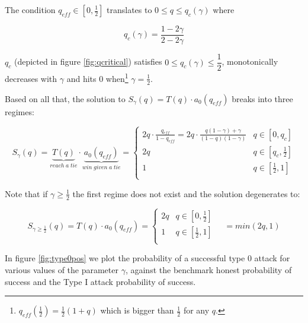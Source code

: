 \documentclass[letterpaper,12pt]{report}
\theoremstyle{plain}
\theoremstyle{definition}
\begin{document}
The condition $q_{eff}\in [0,\frac{1}{2}]$ translates to $0\leq q\leq q_{c}(\gamma)$ where

\begin{equation}\label{qcrit}
q_{c}(\gamma)=\dfrac{1-2\gamma}{2-2\gamma}
\end{equation}

$q_c$ (depicted in figure \ref{fig:qcritical}) satisfies $0 \leq   q_{c}(\gamma) \leq\dfrac{1}{2}$, monotonically decreases with $\gamma$ and hits $0$ when\footnote{$q_{eff}(\frac{1}{2})=\frac{1}{2}(1+q)$ which is bigger than $\frac{1}{2}$ for any $q$.} $\gamma=\frac{1}{2}$.



Based on all that, the solution to $S_\gamma(q)=T(q)\cdot a_0(q_{eff})$ breaks into three regimes:

\begin{equation}\label{sofq}
S_\gamma(q)=\underbrace{T(q)}_{reach\; a\; tie}\cdot \underbrace{a_0(q_{eff})}_{win\;given\;a\;tie}=
\begin{cases}
2q\cdot\frac{q_{eff}}{1-q_{eff}}=2q\cdot\frac{q(1-\gamma)+\gamma}{(1-q)(1-\gamma)} & q\in [0,q_c] \\ 
2q & q\in [q_c,\frac{1}{2}] \\ 
1 & q\in [\frac{1}{2},1] \\ 
\end{cases}
\end{equation}

Note that if $\gamma\geq\frac{1}{2}$ the first regime does not exist and the solution degenerates to:

\begin{equation}\label{sofq2}
S_{\gamma\geq\frac{1}{2}}(q)=T(q)\cdot a_0(q_{eff})=
\begin{cases}
2q & q\in [0,\frac{1}{2}] \\ 
1 & q\in [\frac{1}{2},1] \\ 
\end{cases} \quad = min(2q,1)
\end{equation}

In figure \ref{fig:type0pos} we plot the probability of a successful type 0 attack for various values of the parameter $\gamma$, against the benchmark honest probability of success and the Type I attack probability of success.
\end{document}

